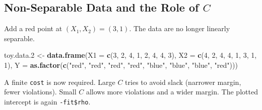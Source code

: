 \documentclass[
]{book}
\newenvironment{Shaded}{\begin{snugshade}}{\end{snugshade}}
\newcommand{\AttributeTok}[1]{\textcolor[rgb]{0.13,0.29,0.53}{#1}}
\newcommand{\DecValTok}[1]{\textcolor[rgb]{0.00,0.00,0.81}{#1}}
\newcommand{\FloatTok}[1]{\textcolor[rgb]{0.00,0.00,0.81}{#1}}
\newcommand{\FunctionTok}[1]{\textcolor[rgb]{0.13,0.29,0.53}{\textbf{#1}}}
\newcommand{\NormalTok}[1]{#1}
\newcommand{\OtherTok}[1]{\textcolor[rgb]{0.56,0.35,0.01}{#1}}
\newcommand{\StringTok}[1]{\textcolor[rgb]{0.31,0.60,0.02}{#1}}
\begin{document}
\subsection*{\texorpdfstring{Non-Separable Data and the Role of \(C\)}{Non-Separable Data and the Role of C}}\label{non-separable-data-and-the-role-of-c}

Add a red point at \((X_1,X_2)=(3,1)\). The data are no longer linearly separable.

\begin{Shaded}
\begin{Highlighting}[]
\NormalTok{toy.data}\FloatTok{.2} \OtherTok{\textless{}{-}} \FunctionTok{data.frame}\NormalTok{(}\AttributeTok{X1 =} \FunctionTok{c}\NormalTok{(}\DecValTok{3}\NormalTok{, }\DecValTok{2}\NormalTok{, }\DecValTok{4}\NormalTok{, }\DecValTok{1}\NormalTok{, }\DecValTok{2}\NormalTok{, }\DecValTok{4}\NormalTok{, }\DecValTok{4}\NormalTok{, }\DecValTok{3}\NormalTok{), }\AttributeTok{X2 =} \FunctionTok{c}\NormalTok{(}\DecValTok{4}\NormalTok{,}
    \DecValTok{2}\NormalTok{, }\DecValTok{4}\NormalTok{, }\DecValTok{4}\NormalTok{, }\DecValTok{1}\NormalTok{, }\DecValTok{3}\NormalTok{, }\DecValTok{1}\NormalTok{, }\DecValTok{1}\NormalTok{), }\AttributeTok{Y =} \FunctionTok{as.factor}\NormalTok{(}\FunctionTok{c}\NormalTok{(}\StringTok{"red"}\NormalTok{, }\StringTok{"red"}\NormalTok{, }\StringTok{"red"}\NormalTok{,}
    \StringTok{"red"}\NormalTok{, }\StringTok{"blue"}\NormalTok{, }\StringTok{"blue"}\NormalTok{, }\StringTok{"blue"}\NormalTok{, }\StringTok{"red"}\NormalTok{)))}
\end{Highlighting}
\end{Shaded}

A finite \texttt{cost} is now required. Large \(C\) tries to avoid slack (narrower margin, fewer violations). Small \(C\) allows more violations and a wider margin. The plotted intercept is again \texttt{-fit\$rho}.
\end{document}

